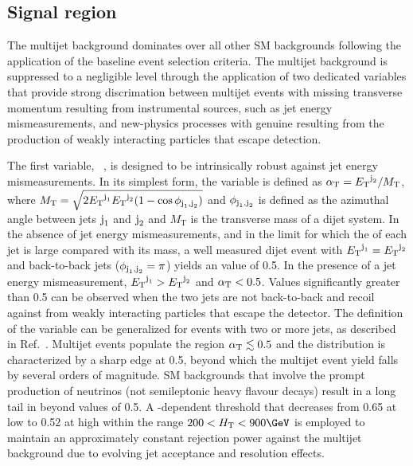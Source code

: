 \subsection{Signal region}
\label{sec:signal}

The multijet background dominates over all other SM backgrounds
following the application of the baseline event selection
criteria. The multijet background is suppressed to a negligible level
through the application of two dedicated variables that provide strong
discrimation between multijet events with missing transverse momentum
resulting from instrumental sources, such as jet energy
mismeasurements, and new-physics processes with genuine \ptvecmiss
resulting from the production of weakly interacting particles that
escape detection.

The first variable, \alphat~\cite{Randall:2008rw, RA1Paper}, is
designed to be intrinsically robust against jet energy
mismeasurements. In its simplest form, the \alphat variable is defined
as $\alpha_{\text{T}} = {E_{\text T}}^{\text{j}_\text{2}}/M_\text{T}$, where $M_\textrm{T} = \sqrt{
  2 {E_{\text T}}^{\text{j}_\text{1}} {E_{\text T}}^{\text{j}_\text{2}} (1 - \cos\phi_{\text{j}_\text{1},\text{j}_\text{2}})}$ and
$\phi_{\text{j}_\text{1},\text{j}_\text{2}}$ is defined as the azimuthal angle between
jets $\text{j}_\text{1}$ and $\text{j}_\text{2}$ and $M_\textrm{T}$ is the transverse mass
of a dijet system. In the absence of jet energy mismeasurements, and
in the limit for which the \Et of each jet is large compared with its
mass, a well measured dijet event with ${E_{\text T}}^{\text{j}_\text{1}} = {E_{\text T}}^{\text{j}_\text{2}}$
and back-to-back jets ($\phi_{\text{j}_\text{1},\text{j}_\text{2}} = \pi$) yields an
\alphat value of 0.5. In the presence of a jet energy mismeasurement,
${E_{\text T}}^{\text{j}_\text{1}} > {E_{\text T}}^{\text{j}_\text{2}}$ and $\alpha_{\text{T}} < 0.5$. Values
significantly greater than 0.5 can be observed when the two jets are
not back-to-back and recoil against \ptvecmiss from weakly interacting
particles that escape the detector. The definition of the \alphat
variable can be generalized for events with two or more jets, as
described in Ref.~\cite{RA1Paper}. Multijet events populate the region
$\alpha_{\text{T}} \lesssim 0.5$ and the \alphat distribution is characterized
by a sharp edge at 0.5, beyond which the multijet event yield falls by
several orders of magnitude. SM backgrounds that involve the prompt
production of neutrinos (\eg not semileptonic heavy flavour decays)
result in a long tail in \alphat beyond values of 0.5. A
\scalht-dependent \alphat threshold that decreases from 0.65 at low
\scalht to 0.52 at high \scalht within the range $200 < \scalht <
900\GeV$ is employed to maintain an approximately constant rejection
power against the multijet background due to evolving jet acceptance
and resolution effects.

